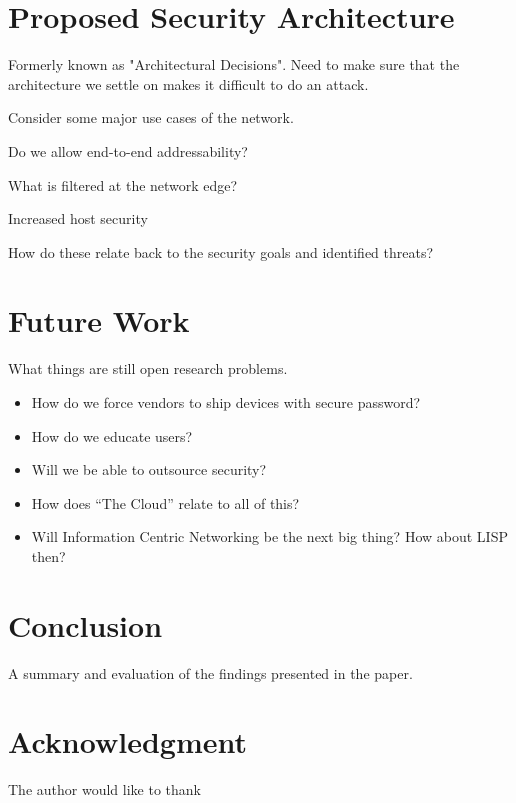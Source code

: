 \documentclass[10pt,journal,compsoc]{IEEEtran}
\begin{document}
\section{Proposed Security Architecture}
Formerly known as "Architectural Decisions". Need to make sure that the
architecture we settle on makes it difficult to do an attack. 

Consider some major use cases of the network.

Do we allow end-to-end addressability?

What is filtered at the network edge?

Increased host security

How do these relate back to the security goals and identified threats?


\section{Future Work}
What things are still open research problems. 

\begin{itemize}
\item How do we force vendors to ship devices with secure password?
\item How do we educate users?
\item Will we be able to outsource security?
\item How does ``The Cloud'' relate to all of this?
\item Will Information Centric Networking be the next big thing? How about LISP then?
\end{itemize}


\section{Conclusion}
A summary and evaluation of the findings presented in the paper.



\section*{Acknowledgment}
The author would like to thank 


\end{document}

